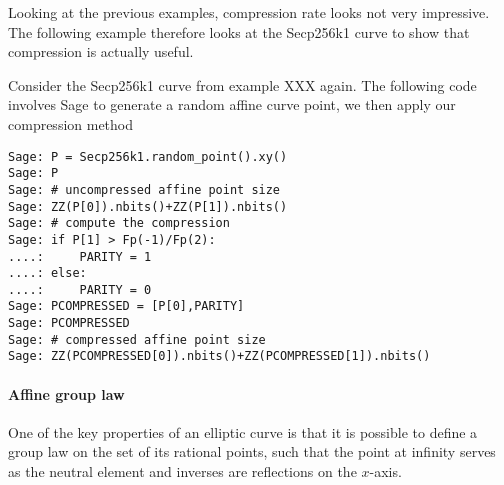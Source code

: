 Looking at the previous examples, compression rate looks not very impressive. The following example therefore looks at the Secp256k1 curve to show that compression is actually useful.
\begin{example}
Consider the Secp256k1 curve from example XXX again. The following code involves Sage to generate a random affine curve point, we then apply our compression method   
\begin{verbatim}
Sage: P = Secp256k1.random_point().xy()
Sage: P
Sage: # uncompressed affine point size
Sage: ZZ(P[0]).nbits()+ZZ(P[1]).nbits()
Sage: # compute the compression
Sage: if P[1] > Fp(-1)/Fp(2):
....:     PARITY = 1
....: else:
....:     PARITY = 0
Sage: PCOMPRESSED = [P[0],PARITY]
Sage: PCOMPRESSED
Sage: # compressed affine point size
Sage: ZZ(PCOMPRESSED[0]).nbits()+ZZ(PCOMPRESSED[1]).nbits()
\end{verbatim}
\end{example}
\paragraph{Affine group law}
One of the key properties of an elliptic curve is that it is possible to define a group law on the set of its rational points, such that the point at infinity serves as the neutral element and inverses are reflections on the $x$-axis.


